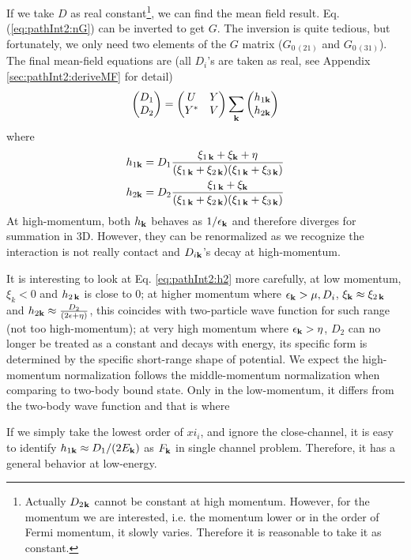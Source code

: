  
  If we take $D$ as real constant\footnote{Actually $D_{2}{_{\mathbf{k}}}$ cannot be constant at high momentum.  However, for the momentum we are interested, i.e. the momentum lower or in the order of Fermi momentum, it slowly varies.  Therefore  it is reasonable to take it as constant.},     we can find the mean field result. Eq. (\ref{eq:pathInt2:nG}) can be inverted to get $G$.  The inversion is quite tedious, but fortunately, we only need two elements of the $G$ matrix ($G_{0\, (21)}$ and $G_{0 \,(31)}$).  The final mean-field equations are (all $D_{i}$'s are taken as real, see Appendix \ref{sec:pathInt2:deriveMF} for detail) 
  \begin{equation}\label{eq:pathInt2:mf}
\begin{pmatrix}D_1\\D_2\end{pmatrix}=\begin{pmatrix}U&Y\\Y^{*}&V\end{pmatrix}\sum_{\mathbf{k}}\begin{pmatrix}h_{1\mathbf{k}}\\h_{2\mathbf{k}}\end{pmatrix}
\end{equation}
  where 
  \begin{gather}
  h_{1\mathbf{k}}=D_{1}\frac{\xi_{1\,\mathbf{k}}+\xi_{\mathbf{k}}+\eta}{(\xi_{1\,\mathbf{k}}+\xi_{2\,\mathbf{k}})(\xi_{1\,\mathbf{k}}+\xi_{3\,\mathbf{k}})}\label{eq:pathInt2:h1}\\
  h_{2\mathbf{k}}=D_{2}\frac{\xi_{1\,\mathbf{k}}+\xi_{\mathbf{k}}}{(\xi_{1\,\mathbf{k}}+\xi_{2\,\mathbf{k}})(\xi_{1\,\mathbf{k}}+\xi_{3\,\mathbf{k}})}\label{eq:pathInt2:h2}
  \end{gather}
At high-momentum, both $h_{\mathbf{k}}$ behaves as $1/\epsilon_{\mathbf{k}}$ and therefore diverges for summation in 3D.  However, they can be  renormalized as we recognize the interaction is not really contact and $D_{i\mathbf{k}}$'s decay at high-momentum.  

It is interesting to look at Eq. \ref{eq:pathInt2:h2} more carefully, at low momentum, $\xi_k<0$ and $h_{2\,\mathbf{k}}$ is close to 0; at higher momentum where $\epsilon_{\mathbf{k}}>\mu,D_i$, $\xi_{\mathbf{k}}\approx\xi_{2\,\mathbf{k}}$ and $  h_{2\mathbf{k}}\approx\frac{D_2}{(2\epsilon+\eta)}$, this coincides with two-particle wave function for such range (not too high-momentum);  at very high momentum where $\epsilon_{\mathbf{k}}>\eta$, $D_2$ can no longer be treated as a constant and decays with energy, its specific form is determined by the specific short-range shape of potential. We expect the high-momentum normalization follows the middle-momentum normalization when comparing to two-body bound state.   Only in the low-momentum, it differs from the two-body wave function and that is where 

If we simply take the lowest order of $xi_{i}$, and ignore the close-channel, it is easy to identify $h_{1\mathbf{k}}\approx{D_{1}}/(2E_{\mathbf{k}})$ as $F_{\mathbf{k}}$ in single channel problem.  Therefore, it has a general behavior at low-energy.  

